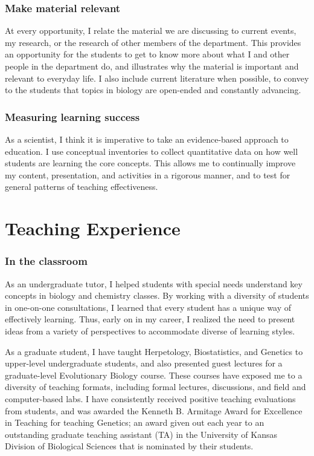 \subsubsection*{Make material relevant}
At every opportunity, I relate the material we are discussing to current
events, my research, or the research of other members of the department.
This provides an opportunity for the students to get to know more about what I
and other people in the department do, and illustrates why the material is
important and relevant to everyday life.
I also include current literature when possible, to convey to the students that
topics in biology are open-ended and constantly advancing.

\subsubsection*{Measuring learning success}
As a scientist, I think it is imperative to take an evidence-based approach to
education.
I use conceptual inventories to collect quantitative data on how well students
are learning the core concepts.
This allows me to continually improve my content, presentation, and activities
in a rigorous manner, and to test for general patterns of teaching
effectiveness.

\section*{Teaching Experience}
\subsubsection*{In the classroom}
As an undergraduate tutor, I helped students with special needs understand
key concepts in biology and chemistry classes.
By working with a diversity of students in one-on-one consultations, I learned
that every student has a unique way of effectively learning.
Thus, early on in my career, I realized the need to present ideas from a
variety of perspectives to accommodate diverse of learning styles.

As a graduate student, I have taught Herpetology, Biostatistics, and Genetics
to upper-level undergraduate students, and also presented guest lectures for a
graduate-level Evolutionary Biology course.
These courses have exposed me to a diversity of teaching formats, including
formal lectures, discussions, and field and computer-based labs.
I have consistently received positive teaching evaluations from students, and
was awarded the Kenneth B. Armitage Award for Excellence in Teaching for
teaching Genetics; an award given out each year to an outstanding graduate
teaching assistant (TA) in the University of Kansas Division of Biological
Sciences that is nominated by their students.


